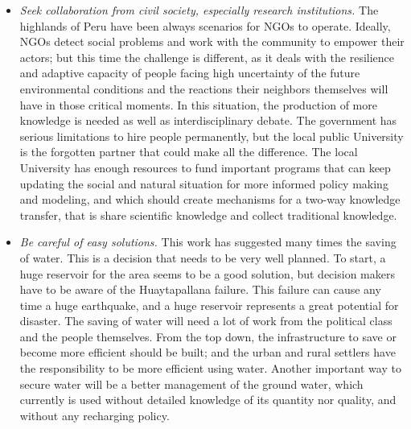 \documentclass{article}
\begin{document}
\begin{itemize}
\item \emph{Seek collaboration from civil society, especially research institutions.} The highlands of Peru have been always scenarios for NGOs to operate. Ideally, NGOs detect social problems and work with the community to empower their actors; but this time the challenge is different, as it deals with the resilience and adaptive capacity of people facing high uncertainty of the future environmental conditions and the reactions their neighbors themselves will have in those critical moments. In this situation, the production of more knowledge is needed as well as interdisciplinary debate. The government has serious limitations to hire people permanently, but the local public University is the forgotten partner that could make all the difference. The local University has enough resources to fund important programs that can keep updating the social and natural situation for more informed policy making and modeling, and which should create mechanisms for a two-way knowledge transfer, that is share scientific knowledge and collect traditional knowledge. 
\item \emph{Be careful of easy solutions.} This work has suggested many times the saving of water. This is a decision that needs to be very well planned. To start, a huge reservoir for the area seems to be a good solution, but decision makers have to be aware of the Huaytapallana failure. This failure can cause any time a huge earthquake, and a huge reservoir represents a great potential for disaster. The saving of water will need a lot of work from the political class and the people themselves. From the top down, the infrastructure to save or become more efficient should be built; and the urban and rural settlers have the responsibility to be more efficient using water. Another important way to secure water will be a better management of the ground water, which currently is used without detailed knowledge of its quantity nor quality, and without any recharging policy.

\end{itemize}





\printbibliography
\end{document}

